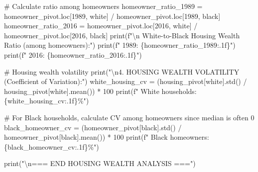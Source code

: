 \documentclass[
  letterpaper,
  DIV=11,
  numbers=noendperiod]{scrartcl}
\newenvironment{Shaded}{\begin{snugshade}}{\end{snugshade}}
\newcommand{\BuiltInTok}[1]{\textcolor[rgb]{0.00,0.23,0.31}{#1}}
\newcommand{\CharTok}[1]{\textcolor[rgb]{0.13,0.47,0.30}{#1}}
\newcommand{\CommentTok}[1]{\textcolor[rgb]{0.37,0.37,0.37}{#1}}
\newcommand{\DecValTok}[1]{\textcolor[rgb]{0.68,0.00,0.00}{#1}}
\newcommand{\NormalTok}[1]{\textcolor[rgb]{0.00,0.23,0.31}{#1}}
\newcommand{\OperatorTok}[1]{\textcolor[rgb]{0.37,0.37,0.37}{#1}}
\newcommand{\SpecialCharTok}[1]{\textcolor[rgb]{0.37,0.37,0.37}{#1}}
\newcommand{\SpecialStringTok}[1]{\textcolor[rgb]{0.13,0.47,0.30}{#1}}
\newcommand{\StringTok}[1]{\textcolor[rgb]{0.13,0.47,0.30}{#1}}
\begin{document}
\begin{Shaded}
\begin{Highlighting}[]
\CommentTok{\# Calculate ratio among homeowners}
\NormalTok{homeowner\_ratio\_1989 }\OperatorTok{=}\NormalTok{ homeowner\_pivot.loc[}\DecValTok{1989}\NormalTok{, }\StringTok{\textquotesingle{}white\textquotesingle{}}\NormalTok{] }\OperatorTok{/}\NormalTok{ homeowner\_pivot.loc[}\DecValTok{1989}\NormalTok{, }\StringTok{\textquotesingle{}black\textquotesingle{}}\NormalTok{]}
\NormalTok{homeowner\_ratio\_2016 }\OperatorTok{=}\NormalTok{ homeowner\_pivot.loc[}\DecValTok{2016}\NormalTok{, }\StringTok{\textquotesingle{}white\textquotesingle{}}\NormalTok{] }\OperatorTok{/}\NormalTok{ homeowner\_pivot.loc[}\DecValTok{2016}\NormalTok{, }\StringTok{\textquotesingle{}black\textquotesingle{}}\NormalTok{]}
\BuiltInTok{print}\NormalTok{(}\SpecialStringTok{f"}\CharTok{\textbackslash{}n}\SpecialStringTok{   White{-}to{-}Black Housing Wealth Ratio (among homeowners):"}\NormalTok{)}
\BuiltInTok{print}\NormalTok{(}\SpecialStringTok{f"     1989: }\SpecialCharTok{\{}\NormalTok{homeowner\_ratio\_1989}\SpecialCharTok{:.1f\}}\SpecialStringTok{"}\NormalTok{)}
\BuiltInTok{print}\NormalTok{(}\SpecialStringTok{f"     2016: }\SpecialCharTok{\{}\NormalTok{homeowner\_ratio\_2016}\SpecialCharTok{:.1f\}}\SpecialStringTok{"}\NormalTok{)}

\CommentTok{\# Housing wealth volatility}
\BuiltInTok{print}\NormalTok{(}\StringTok{"}\CharTok{\textbackslash{}n}\StringTok{4. HOUSING WEALTH VOLATILITY (Coefficient of Variation):"}\NormalTok{)}
\NormalTok{white\_housing\_cv }\OperatorTok{=}\NormalTok{ (housing\_pivot[}\StringTok{\textquotesingle{}white\textquotesingle{}}\NormalTok{].std() }\OperatorTok{/}\NormalTok{ housing\_pivot[}\StringTok{\textquotesingle{}white\textquotesingle{}}\NormalTok{].mean()) }\OperatorTok{*} \DecValTok{100}
\BuiltInTok{print}\NormalTok{(}\SpecialStringTok{f"   White households: }\SpecialCharTok{\{}\NormalTok{white\_housing\_cv}\SpecialCharTok{:.1f\}}\SpecialStringTok{\%"}\NormalTok{)}

\CommentTok{\# For Black households, calculate CV among homeowners since median is often 0}
\NormalTok{black\_homeowner\_cv }\OperatorTok{=}\NormalTok{ (homeowner\_pivot[}\StringTok{\textquotesingle{}black\textquotesingle{}}\NormalTok{].std() }\OperatorTok{/}\NormalTok{ homeowner\_pivot[}\StringTok{\textquotesingle{}black\textquotesingle{}}\NormalTok{].mean()) }\OperatorTok{*} \DecValTok{100}
\BuiltInTok{print}\NormalTok{(}\SpecialStringTok{f"   Black homeowners: }\SpecialCharTok{\{}\NormalTok{black\_homeowner\_cv}\SpecialCharTok{:.1f\}}\SpecialStringTok{\%"}\NormalTok{)}

\BuiltInTok{print}\NormalTok{(}\StringTok{"}\CharTok{\textbackslash{}n}\StringTok{=== END HOUSING WEALTH ANALYSIS ==="}\NormalTok{)  }
\end{Highlighting}
\end{Shaded}
\end{document}
